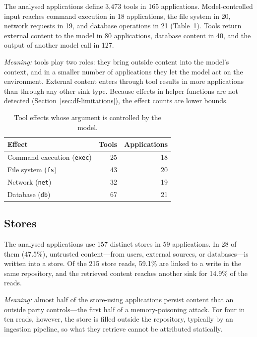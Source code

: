 The analysed applications define 3{,}473 tools in 165 applications. Model-controlled input reaches command execution in 18 applications, the file system in 20, network requests in 19, and database operations in 21 (Table~\ref{tab:res-tool-effects}). Tools return external content to the model in 80 applications, database content in 40, and the output of another model call in 127.

\emph{Meaning:} tools play two roles: they bring outside content into the model's context, and in a smaller number of applications they let the model act on the environment. External content enters through tool results in more applications than through any other sink type. Because effects in helper functions are not detected (Section~\ref{sec:df-limitations}), the effect counts are lower bounds.

\begin{table}[t]
\centering
\renewcommand{\arraystretch}{1.2}
\caption{Tool effects whose argument is controlled by the model.}
\label{tab:res-tool-effects}
\begin{tabular}{@{}lrr@{}}
\toprule
\textbf{Effect} & \textbf{Tools} & \textbf{Applications} \\
\midrule
Command execution (\texttt{exec}) & 25 & 18 \\
File system (\texttt{fs})         & 43 & 20 \\
Network (\texttt{net})            & 32 & 19 \\
Database (\texttt{db})            & 67 & 21 \\
\bottomrule
\end{tabular}
\end{table}

\subsection{Stores}

The analysed applications use 157 distinct stores in 59 applications. In 28 of them (47.5\%), untrusted content---from users, external sources, or databases---is written into a store. Of the 215 store reads, 59.1\% are linked to a write in the same repository, and the retrieved content reaches another sink for 14.9\% of the reads.

\emph{Meaning:} almost half of the store-using applications persist content that an outside party controls---the first half of a memory-poisoning attack. For four in ten reads, however, the store is filled outside the repository, typically by an ingestion pipeline, so what they retrieve cannot be attributed statically.

